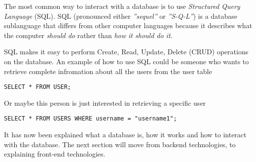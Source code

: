 \documentclass[../../master.tex]{subfiles}
\begin{document}
The most common way to interact with a database is to use \textit{Structured Query Language} (SQL).
SQL (pronounced either \textit{''sequel''} or \textit{''S-Q-L''}) is a database sublanguage that differs from other computer languages because it describes what the computer \textit{should do} rather than \textit{how it should do it}.\cite{SQLIntroduction}

SQL makes it easy to perform Create, Read, Update, Delete (CRUD) operations on the database.\cite{OracleWhatIsDatabase}
An example of how to use SQL could be someone who wants to retrieve complete infromation about all the users from the user table

\begin{lstlisting}[caption={An SQL query that fetches complete information for every user}, label=lstSQL-user1]
SELECT * FROM USER;
\end{lstlisting}

Or maybe this person is just interested in retrieving a specific user

\begin{lstlisting}[caption={An SQL query that only fetches complete information for username1}, label=lstSQL-user2]
SELECT * FROM USERS WHERE username = "username1";
\end{lstlisting}

It has now been explained what a database is, how it works and how to interact with the database.
The next section will move from backend technologies, to explaining front-end technologies.
\end{document}
